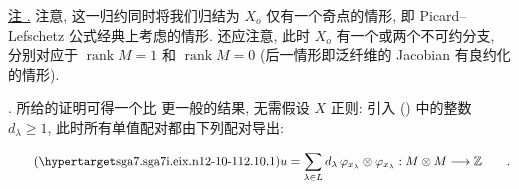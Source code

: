 \medskip
\noindent
\underline{注 .} 注意, 这一归约同时将我们归结为 $X_o$ 仅有一个奇点的情形, 即 Picard--Lefschetz 公式经典上考虑的情形. 还应注意, 此时 $X_o$ 有一个或两个不可约分支, 分别对应于 $\operatorname{rank}M=1$ 和 $\operatorname{rank}M=0$ (后一情形即泛纤维的 Jacobian 有良约化的情形).

\medskip
\noindent
{}.  所给的证明可得一个比  更一般的结果, 无需假设 $X$ 正则: 引入 () 中的整数 $d_\lambda\geqslant1$, 此时所有单值配对都由下列配对导出:

\begin{equation}\tag{\SGARefTarget{sga7.sga7i.eix.n12-10-1}{12.10.1}}
 u=\sum_{\lambda\in L}d_\lambda\,
   \varphi_{x_\lambda}\otimes\varphi_{x_\lambda}:
   M\otimes M\longrightarrow\mathbb Z\qquad .
\end{equation}


